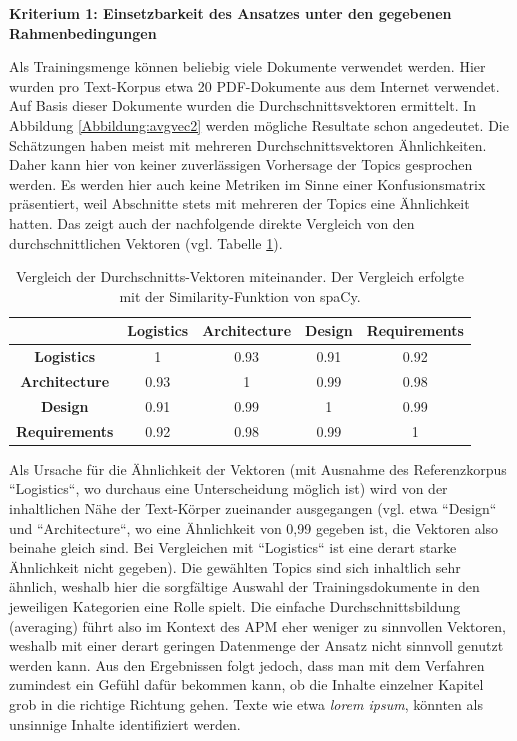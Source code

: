 {\bf Kriterium 1: Einsetzbarkeit des Ansatzes unter den gegebenen Rahmenbedingungen}

Als Trainingsmenge können beliebig viele Dokumente verwendet werden. Hier wurden pro Text-Korpus etwa 20 PDF-Dokumente aus dem Internet verwendet. Auf Basis dieser Dokumente wurden die Durchschnittsvektoren ermittelt. 
In Abbildung \ref{Abbildung:avgvec2} werden mögliche Resultate schon angedeutet. Die Schätzungen haben meist mit mehreren Durchschnittsvektoren Ähnlichkeiten. Daher kann hier von keiner zuverlässigen Vorhersage der Topics gesprochen werden. 
Es werden hier auch keine Metriken im Sinne einer Konfusionsmatrix präsentiert, weil Abschnitte stets mit mehreren der Topics eine Ähnlichkeit hatten. Das zeigt auch der nachfolgende direkte Vergleich von den durchschnittlichen Vektoren (vgl. Tabelle \ref{table:4}).

\begin{table}[h]
\centering
\begin{tabular}{|c|c|c|c|c|}
\hline
                      & \textbf{Logistics} & \textbf{Architecture} & \textbf{Design} & \textbf{Requirements} \\ \hline
\textbf{Logistics}    & 1                  & 0.93                  & 0.91            & 0.92                  \\ \hline
\textbf{Architecture} & 0.93               & 1                     & 0.99            & 0.98                  \\ \hline
\textbf{Design}       & 0.91               & 0.99                  & 1               & 0.99                  \\ \hline
\textbf{Requirements} & 0.92               & 0.98                  & 0.99            & 1                     \\ \hline
\end{tabular}
\caption{Vergleich der Durchschnitts-Vektoren miteinander. Der Vergleich erfolgte mit der Similarity-Funktion von spaCy.}
\label{table:4}
\end{table}

Als Ursache für die Ähnlichkeit der Vektoren (mit Ausnahme des Referenzkorpus ``Logistics``, wo durchaus eine Unterscheidung möglich ist) wird von der inhaltlichen Nähe der Text-Körper zueinander ausgegangen (vgl. etwa ``Design`` und ``Architecture``, wo eine Ähnlichkeit von 0,99 gegeben ist, die Vektoren also beinahe gleich sind. Bei Vergleichen mit ``Logistics`` ist eine derart starke Ähnlichkeit nicht gegeben). Die gewählten Topics sind sich inhaltlich sehr ähnlich, weshalb hier die sorgfältige Auswahl der Trainingsdokumente in den jeweiligen Kategorien eine Rolle spielt. Die einfache Durchschnittsbildung (averaging) führt also im Kontext des APM eher weniger zu sinnvollen Vektoren, weshalb mit einer derart geringen Datenmenge der Ansatz nicht sinnvoll genutzt werden kann.
Aus den Ergebnissen folgt jedoch, dass man mit dem Verfahren zumindest ein Gefühl dafür bekommen kann, ob die Inhalte einzelner Kapitel grob in die richtige Richtung gehen. Texte wie etwa {\textit{lorem ipsum}}, könnten als unsinnige Inhalte identifiziert werden.

